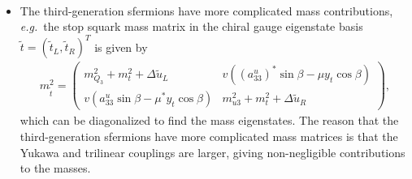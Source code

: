 \documentclass[twoside,english]{uiofysmaster}
\begin{document}
\begin{itemize}
\begin{align}
 	\end{align}
 	\item The third-generation sfermions have more complicated mass contributions, {\it e.g.}\ the stop squark mass matrix in the chiral gauge eigenstate basis $\tilde t = (\tilde t_L, \tilde t_R)^T$ is given by
 	\begin{align}
 		m^2_{\tilde t} = \begin{pmatrix}
 			m^2_{Q_3} + m_t^2 + \Delta \tilde u_L & v((a_{33}^u)^* \sin\beta - \mu y_t \cos\beta)\\
 			v(a_{33}^u \sin\beta - \mu^* y_t \cos\beta) & m^2_{u3} + m^2_t + \Delta \tilde u_R
 		\end{pmatrix},
 	\end{align}
 	which can be diagonalized to find the mass eigenstates. The reason that the third-generation sfermions have more complicated mass matrices is that the Yukawa and trilinear couplings are larger, giving non-negligible contributions to the masses.
 \end{itemize}
\end{document}
